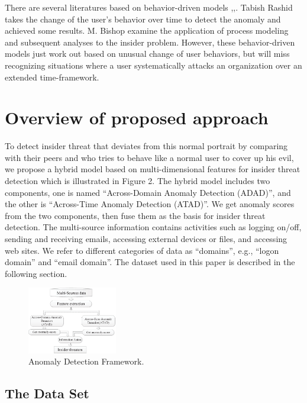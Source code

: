 \documentclass[conference]{IEEEtran}
\begin{document}
There are several literatures based on behavior-driven models \cite{b7},\cite{b11},\cite{b12}. 
Tabish Rashid \cite{b17} takes the change of the user's behavior over time to detect the anomaly and achieved some results. M. Bishop \cite{b11} examine the application of process modeling
and subsequent analyses to the insider problem. 
However, these behavior-driven models just work out based on unusual change of user behaviors, but will miss recognizing situations where a user systematically attacks an organization over an extended time-framework.



\section{Overview of proposed approach}
To detect insider threat that deviates from this
normal portrait by comparing with their peers and who tries to behave like a normal user to cover up his evil,
we propose a hybrid model based on multi-dimensional features for insider threat detection which is illustrated in Figure 2. The hybrid model includes two components, one is named ``Across-Domain Anomaly Detection (ADAD)'', and the other is ``Across-Time Anomaly Detection (ATAD)''. We get anomaly scores from the two components, then fuse them as the basis for insider threat detection.  The multi-source information contains activities such as logging on/off, sending and receiving emails, accessing external devices or files, and
accessing web sites. We refer to different categories of data as “domains”, e.g., “logon domain” and “email domain”. The dataset used in this paper is described in the following section. 


\begin{figure}[htb]
\centerline{\includegraphics[width = 0.35\textwidth]{figure/figure2.eps}}
\caption{Anomaly Detection Framework.}
\label{fig}
\end{figure}

\subsection{The Data Set}
\end{document}
